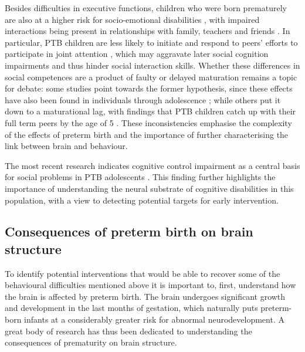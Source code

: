 Besides difficulties in executive functions, children who were born prematurely are also at a higher risk for socio-emotional disabilities \citep{Zmyj2017}, with impaired interactions being present in relationships with family, teachers and friends \citep{Twilhaar2019}. In particular, PTB children are less likely to initiate and respond to peers' efforts to participate in joint attention \citep{Zmyj2017}, which may aggravate later social cognition impairments and thus hinder social interaction skills. Whether these differences in social competences are a product of faulty or delayed maturation remains a topic for debate: some studies point towards the former hypothesis, since these effects have also been found in individuals through adolescence  \citep{Healy2013, Saigal2016}; while others put it down to a maturational lag, with findings that PTB children catch up with their full term peers by the age of 5 \citep{Witt2018}. These inconsistencies emphasise the complexity of the effects of preterm birth and the importance of further characterising the link between brain and behaviour.

The most recent research indicates cognitive control impairment as a central basis for social problems in PTB adolescents \citep{Twilhaar2019}. This finding further highlights the importance of understanding the neural substrate of cognitive disabilities in this population, with a view to detecting potential targets for early intervention. 


\subsection{Consequences of preterm birth on brain structure}

To identify potential interventions that would be able to recover some of the behavioural difficulties mentioned above it is important to, first, understand how the brain is affected by preterm birth. The brain undergoes significant growth and development in the last months of gestation, which naturally puts preterm-born infants at a considerably greater risk for abnormal neurodevelopment. A great body of research has thus been dedicated to understanding the consequences of prematurity on brain structure.

